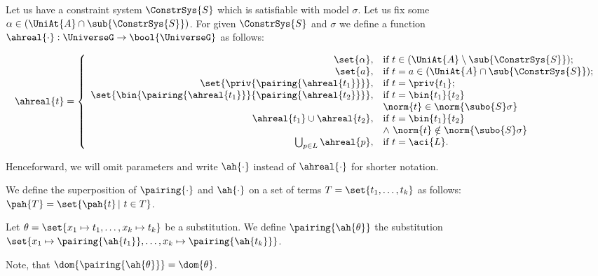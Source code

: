 \begin{df}\label{def:ah}

 Let us have a constraint system $\ConstrSys{S}$ which is satisfiable with model $\sigma$.
 Let us fix some $\alpha \in ( \UniAt{A} \cap \sub{\ConstrSys{S}})$.
 For given $\ConstrSys{S}$ and $\sigma$ we define a function $\ahreal{\cdot}: \UniverseG \rightarrow \bool{\UniverseG}$  as follows:


\[
 \ahreal{t} = \left\{ 
 \begin{array}{rl} 
   \set{\alpha}, & \mbox{if } {t}  \in (\UniAt{A} \setminus \sub{\ConstrSys{S}});\\
   \set{a}, & \mbox{if } {t} = a \in (\UniAt{A}\cap \sub{\ConstrSys{S}});\\
   
	\set{\priv{\pairing{\ahreal{t_1}}}} , & \mbox{if } t = \priv{t_1};\\
    

   \set{\bin{\pairing{\ahreal{t_1}}}{\pairing{\ahreal{t_2}}}} , & \mbox{if } {t} = \bin{t_1}{t_2}\\
&  \norm{t} \in \norm{\subo{S}\sigma}\\

   \ahreal{t_1} \cup\ahreal{t_2} , & \mbox{if } {t} = \bin{t_1}{t_2}   \\
				&  \wedge\  \norm{t} \notin \norm{\subo{S}\sigma} \\
\bigcup_{p\in L}\ahreal{p},  & \mbox{if } {t}=\aci{L}.\\
  
 \end{array}
 \right. 
\]

\end{df}

Henceforward, we will omit parameters and write $\ah{\cdot}$ instead of $\ahreal{\cdot}$ for shorter notation.


\begin{df}
 We define the superposition of $\pairing{\cdot}$ and $\ah{\cdot}$ on a set of terms $T=\set{t_1,\dots,t_k}$ as follows: $\pah{T} = \set{\pah{t}\,|\ t\in T}$.
\end{df}

\begin{df}
 Let $\theta =\set{x_1 \mapsto t_1, \dots, x_k \mapsto t_k }$  be a substitution. We  define $\pairing{\ah{\theta}}$ the  substitution $\set{x_1 \mapsto \pairing{\ah{t_1}}, \dots, x_k \mapsto \pairing{\ah{t_k}}}$.

\end{df}
Note, that $\dom{\pairing{\ah{\theta}}} = \dom{\theta}$.

